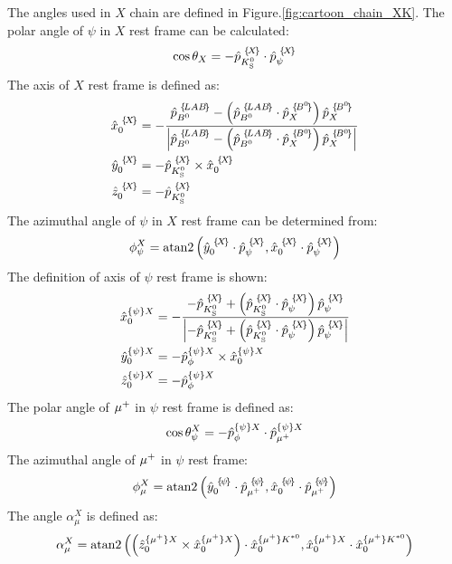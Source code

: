 The angles used in $X$ chain are defined in Figure.\ref{fig:cartoon_chain_XK}.
The polar angle of $\psi$ in $X$ rest frame can be calculated:
\begin{equation}
\cos \theta_{X} = -{\hat{p}}_{{{{K}^0_{\mathrm{S}}}}}^{\,\,\{\!X\!\}} \cdot {\hat{p}}_{{\psi}}^{\,\,\{\!X\!\}}
\end{equation}
The axis of $X$ rest frame is defined as: 
\begin{align}
\BA{\hat{x}}{0}{X} & = - \frac{\BA{\hat{p}}{\Bz}{LAB} - \left(\BA{\hat{p}}{\Bz}{LAB} \cdot \BA{\hat{p}}{X}{\Bz} \right) \BA{\hat{p}}{X}{\Bz} }  
{\left|\BA{\hat{p}}{\Bz}{LAB} - \left(\BA{\hat{p}}{\Bz}{LAB} \cdot \BA{\hat{p}}{X}{\Bz} \right) \BA{\hat{p}}{X}{\Bz}\right|}\\
\BA{\hat{y}}{0}{X} &= - \BA{\hat{p}}{\KS}{X} \times \BA{\hat{x}}{0}{X}\\
\BA{\hat{z}}{0}{X} & = - \BA{\hat{p}}{\KS}{X}
\end{align}
The azimuthal angle of $\psi$ in $X$ rest frame can be determined from:
\begin{equation}
\phi_{\psi}^{X} = \mathrm{atan2}  \left( \BA{\hat{y}}{0}{X} \cdot \BA{\hat{p}}{\psi}{X} , \BA{\hat{x}}{0}{X} \cdot \BA{\hat{p}}{\psi}{X} \right)
\end{equation}
The definition of axis of $\psi$ rest frame is shown:
\begin{align}
{\hat{x}}_{0}^{\{\psi\}X} & = - \frac{- \BA{\hat{p}}{\KS}{X} + \left(\BA{\hat{p}}{\KS}{X} \cdot \BA{\hat{p}}{\psi}{X} \right) \BA{\hat{p}}{\psi}{X} }  
{\left| - \BA{\hat{p}}{\KS}{X} + \left(\BA{\hat{p}}{\KS}{X} \cdot \BA{\hat{p}}{\psi}{X} \right) \BA{\hat{p}}{\psi}{X} \right|}\\
{\hat{y}}_{0}^{\{\psi\}X} &= - {\hat{p}}_{\phi}^{\{\psi\}X} \times {\hat{x}}_{0}^{\{\psi\}X}\\
{\hat{z}}_{0}^{\{\psi\}X} & = - {\hat{p}}_{\phi}^{\{\psi\}X}
\end{align}
The polar angle of ${\mu^+}$ in $\psi$ rest frame is defined as:
\begin{equation}
\cos \theta_{\psi}^{X} = -{\hat{p}}_{\phi}^{\{\psi\}X} \cdot {\hat{p}}_{{\mu^+}}^{\{\psi\}X}
\end{equation}
The azimuthal angle of ${\mu^+}$ in $\psi$ rest frame:
\begin{equation}
\phi_{\mu}^{X} = \mathrm{atan2}  \left(  \BA{\hat{y}}{0}{\psi} \cdot \BA{\hat{p}}{\mup}{\psi}, \BA{\hat{x}}{0}{\psi} \cdot \BA{\hat{p}}{\mup}{\psi} \right)
\end{equation}
The angle $\alpha_\mu^X$ is defined as:
\begin{equation}
\alpha_\mu^X = \mathrm{atan2}\left( \left(  \hat{z}_0^{\{{\mu^+}\}X}  \times  \hat{x}_0^{\{{\mu^+}\}X}  \right) \cdot \hat{x}_0^{\{{\mu^+}\}{{K}^{*0}}}, \hat{x}_0^{\{{\mu^+}\}X}  \cdot \hat{x}_0^{\{{\mu^+}\}{{K}^{*0}}} \right)
\end{equation}
